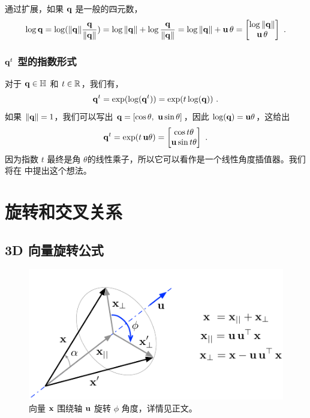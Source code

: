 通过扩展，如果 ${\bf q}$ 是一般的四元数，
%
\begin{align}
\log{\bf q} = \log({\left\|{\bf q}\right\|}\frac{{\bf q}}{{\left\|{\bf q}\right\|}}) = \log{\left\|{\bf q}\right\|} + \log\frac{{\bf q}}{{\left\|{\bf q}\right\|}} = \log{\left\|{\bf q}\right\|} + {\bf u}\,\theta = \begin{bmatrix}
\log{\left\|{\bf q}\right\|} \\ {\bf u}\,\theta
\end{bmatrix}
~.
\end{align}

\subsubsection{ ${\bf q}^t$ 型的指数形式}

对于 ${\bf q}\in{\mathbb H}$ 和 $t\in{\mathbb R}$，我们有，
%
\begin{align}
{\bf q}^t = \exp(\log({\bf q}^t)) = \exp(t\log({\bf q}))
~.
\end{align}
%
如果 ${\left\|{\bf q}\right\|}=1$，我们可以写出 ${\bf q}=[\cos\theta,~{\bf u}\sin\theta]$，因此 $\log({\bf q})={\bf u}\theta$，这给出
%
\begin{align}\label{equ:qa}
{\bf q}^t = \exp(t\,{\bf u}\theta)=\begin{bmatrix}
\cos t\theta \\
{\bf u}\sin t\theta
\end{bmatrix}
~.
\end{align}
%
因为指数 $t$ 最终是角 $\theta$的线性乘子，所以它可以看作是一个线性角度插值器。我们将在  中提出这个想法。

\section{旋转和交叉关系}
\label{sec:rotations}

\subsection{3D 向量旋转公式}

\begin{figure}[htbp]
\centering
\includegraphics{figures/rotation3d}
\caption{向量 ${\bf x}$ 围绕轴 ${\bf u}$ 旋转 $\phi$ 角度，详情见正文。}
\label{fig:rotation3d}
\end{figure}

